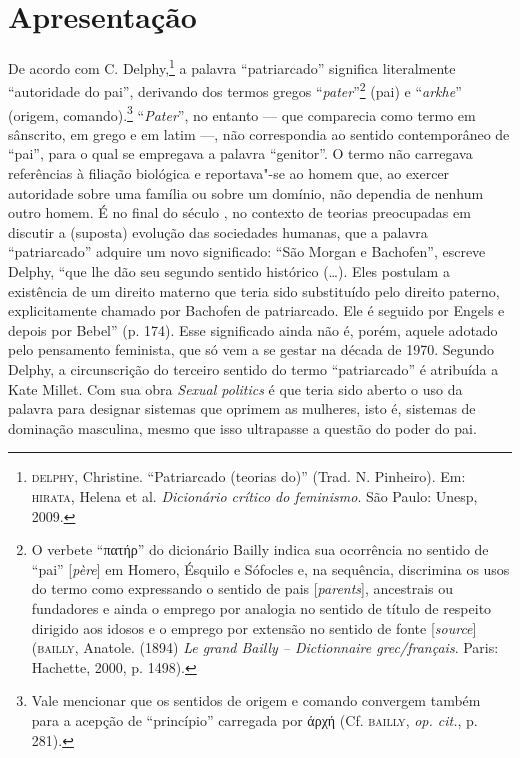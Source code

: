 \chapter{Apresentação}

De acordo com C. Delphy,\footnote{\textsc{delphy}, Christine. ``Patriarcado
  (teorias do)'' (Trad. N. Pinheiro). Em: \textsc{hirata}, Helena et al.
  \emph{Dicionário crítico do feminismo}. São Paulo: Unesp, 2009.} a
palavra ``patriarcado'' significa literalmente ``autoridade do pai'',
derivando dos termos gregos ``\emph{pater}''\footnote{O verbete
  ``πατήρ'' do dicionário Bailly indica sua ocorrência no sentido de
  ``pai'' {[}\emph{père}{]} em Homero, Ésquilo e Sófocles e, na
  sequência, discrimina os usos do termo como expressando o sentido de
  pais {[}\emph{parents}{]}, ancestrais ou fundadores e ainda o emprego
  por analogia no sentido de título de respeito dirigido aos idosos e o
  emprego por extensão no sentido de fonte {[}\emph{source}{]} (\textsc{bailly},
  Anatole. (1894) \emph{Le grand Bailly -- Dictionnaire grec/français}.
  Paris: Hachette, 2000, p. 1498).} (pai) e ``\emph{arkhe}'' (origem,
comando).\footnote{Vale mencionar que os sentidos de origem e comando
  convergem também para a acepção de ``princípio'' carregada por άρχή
  (Cf. \textsc{bailly}, \emph{op. cit.}, p. 281).} ``\emph{Pater}'', no entanto
--- que comparecia como termo em sânscrito, em grego e em latim ---, não
correspondia ao sentido contemporâneo de ``pai'', para o qual se
empregava a palavra ``genitor''. O termo não carregava referências à filiação biológica e reportava"-se ao homem que, ao exercer autoridade sobre uma família ou sobre um domínio, não dependia de nenhum outro homem. É no final do século , no contexto de teorias preocupadas em
discutir a (suposta) evolução das sociedades humanas, que a palavra
``patriarcado'' adquire um novo significado: ``São Morgan e Bachofen'',
escreve Delphy, ``que lhe dão seu segundo sentido histórico (\ldots{}). Eles
postulam a existência de um direito materno que teria sido substituído
pelo direito paterno, explicitamente chamado por Bachofen de
patriarcado. Ele é seguido por Engels e depois por Bebel'' (p. 174).
Esse significado ainda não é, porém, aquele adotado pelo
pensamento feminista, que só vem a se gestar na década
de 1970. Segundo Delphy, a circunscrição do terceiro sentido
do termo ``patriarcado'' é atribuída a Kate Millet. Com sua obra
\emph{Sexual politics} é que teria sido aberto o uso da palavra para
designar sistemas que oprimem as mulheres, isto é, sistemas de dominação
masculina, mesmo que isso ultrapasse a questão do poder do pai.

